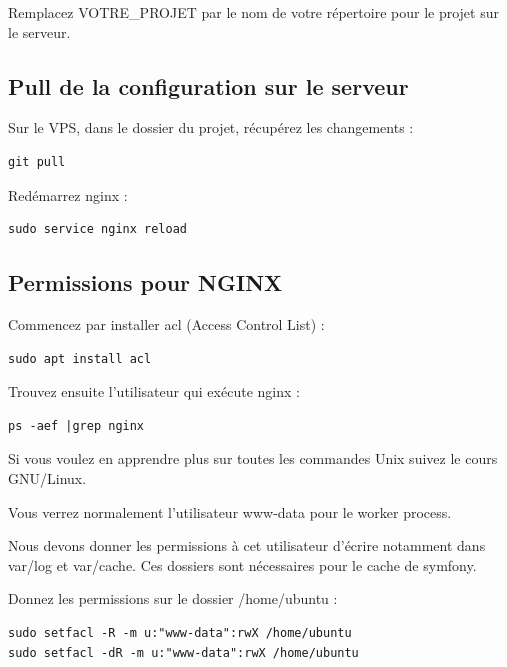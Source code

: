 \documentclass{article}
\begin{document}
Remplacez VOTRE\_PROJET par le nom de votre répertoire pour le projet sur le serveur.

\subsection{Pull de la configuration sur le serveur}
Sur le VPS, dans le dossier du projet, récupérez les changements :
\begin{verbatim}
git pull
\end{verbatim}

Redémarrez nginx :
\begin{verbatim}
sudo service nginx reload
\end{verbatim}

\subsection{Permissions pour NGINX}
Commencez par installer acl (Access Control List) :
\begin{verbatim}
sudo apt install acl
\end{verbatim}

Trouvez ensuite l'utilisateur qui exécute nginx :
\begin{verbatim}
ps -aef |grep nginx
\end{verbatim}

Si vous voulez en apprendre plus sur toutes les commandes Unix suivez le cours GNU/Linux.

Vous verrez normalement l'utilisateur www-data pour le worker process.

Nous devons donner les permissions à cet utilisateur d'écrire notamment dans var/log et var/cache. Ces dossiers sont nécessaires pour le cache de symfony.

Donnez les permissions sur le dossier /home/ubuntu :
\begin{verbatim}
sudo setfacl -R -m u:"www-data":rwX /home/ubuntu
sudo setfacl -dR -m u:"www-data":rwX /home/ubuntu
\end{verbatim}
\end{document}
